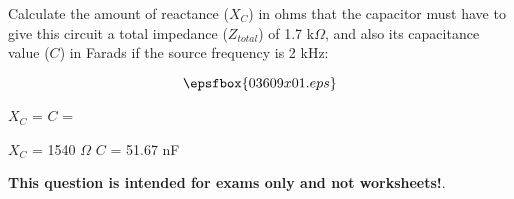 

Calculate the amount of reactance ($X_C$) in ohms that the capacitor must have to give this circuit a total impedance ($Z_{total}$) of 1.7 k$\Omega$, and also its capacitance value ($C$) in Farads if the source frequency is 2 kHz:

$$\epsfbox{03609x01.eps}$$

\vskip 10pt

$X_C$ =  \hskip 100pt $C$ = 







$X_C$ = 1540 $\Omega$ \hskip 100pt $C$ = 51.67 nF







{\bf This question is intended for exams only and not worksheets!}.



